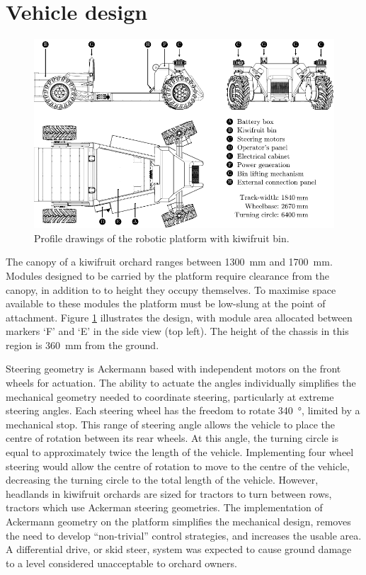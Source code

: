 \documentclass[preprint,authoryear,12pt]{elsarticle}
\begin{document}
\section{Vehicle design}
\label{sect:mechanical}

    \begin{figure}[htb]
        \centering
        \includegraphics[width=\linewidth]{imgs/profile_views/AMMP-All-Labelled.pdf}
        \caption{Profile drawings of the robotic platform with kiwifruit bin.}
        \label{fig:AMMP}
    \end{figure}

    The canopy of a kiwifruit orchard ranges between \SI{1300}{\milli\meter} and \SI{1700}{\milli\meter}.
    Modules designed to be carried by the platform require clearance from the canopy, in addition to to height they occupy themselves.
    To maximise space available to these modules the platform must be low-slung at the point of attachment.
    Figure \ref{fig:AMMP} illustrates the design, with module area allocated between markers `F' and `E' in the side view (top left).
    The height of the chassis in this region is \SI{360}{\milli\meter} from the ground.

    Steering geometry is Ackermann based with independent motors on the front wheels for actuation.
    The ability to actuate the angles individually simplifies the mechanical geometry needed to coordinate steering, particularly at extreme steering angles.
    Each steering wheel has the freedom to rotate \SI{340}{\degree}, limited by a mechanical stop.
    This range of steering angle allows the vehicle to place the centre of rotation between its rear wheels.
    At this angle, the turning circle is equal to approximately twice the length of the vehicle.
    Implementing four wheel steering would allow the centre of rotation to move to the centre of the vehicle, decreasing the turning circle to the total length of the vehicle.
    However, headlands in kiwifruit orchards are sized for tractors to turn between rows, tractors which use Ackerman steering geometries.
    The implementation of Ackermann geometry on the platform simplifies the mechanical design, removes the need to develop ``non-trivial'' control strategies, and increases the usable area.
    A differential drive, or skid steer, system was expected to cause ground damage to a level considered unacceptable to orchard owners.
\end{document}
